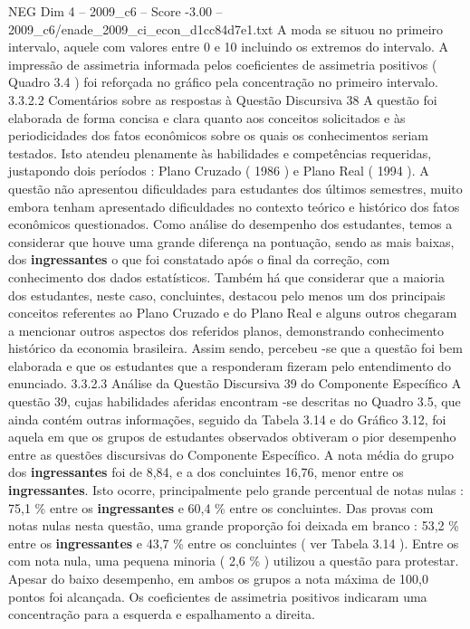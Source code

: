 \begin{textsample}{NEG Dim 4 – 2009\_c6 – Score -3.00 – 2009\_c6/enade\_2009\_ci\_econ\_d1cc84d7e1.txt}
A moda se situou no primeiro intervalo, aquele com valores entre 0 e 10 incluindo os extremos do intervalo.
A impressão de assimetria informada pelos coeficientes de assimetria positivos ( Quadro 3.4 ) foi reforçada no gráfico pela concentração no primeiro intervalo. 3.3.2.2 Comentários sobre as respostas à Questão Discursiva 38 A questão foi elaborada de forma concisa e clara quanto aos conceitos solicitados e às periodicidades dos fatos econômicos sobre os quais os conhecimentos seriam testados.
Isto atendeu plenamente às habilidades e competências requeridas, justapondo dois períodos : Plano Cruzado ( 1986 ) e Plano Real ( 1994 ).
A questão não apresentou dificuldades para estudantes dos últimos semestres, muito embora tenham apresentado dificuldades no contexto teórico e histórico dos fatos econômicos questionados.
Como análise do desempenho dos estudantes, temos a considerar que houve uma grande diferença na pontuação, sendo as mais baixas, dos \textbf{ingressantes} o que foi constatado após o final da correção, com conhecimento dos dados estatísticos.
Também há que considerar que a maioria dos estudantes, neste caso, concluintes, destacou pelo menos um dos principais conceitos referentes ao Plano Cruzado e do Plano Real e alguns outros chegaram a mencionar outros aspectos dos referidos planos, demonstrando conhecimento histórico da economia brasileira.
Assim sendo, percebeu -se que a questão foi bem elaborada e que os estudantes que a responderam fizeram pelo entendimento do enunciado. 3.3.2.3 Análise da Questão Discursiva 39 do Componente Específico A questão 39, cujas habilidades aferidas encontram -se descritas no Quadro 3.5, que ainda contém outras informações, seguido da Tabela 3.14 e do Gráfico 3.12, foi aquela em que os grupos de estudantes observados obtiveram o pior desempenho entre as questões discursivas do Componente Específico.
A nota média do grupo dos \textbf{ingressantes} foi de 8,84, e a dos concluintes 16,76, menor entre os \textbf{ingressantes}.
Isto ocorre, principalmente pelo grande percentual de notas nulas : 75,1 \% entre os \textbf{ingressantes} e 60,4 \% entre os concluintes.
Das provas com notas nulas nesta questão, uma grande proporção foi deixada em branco : 53,2 \% entre os \textbf{ingressantes} e 43,7 \% entre os concluintes ( ver Tabela 3.14 ).
Entre os com nota nula, uma pequena minoria ( 2,6 \% ) utilizou a questão para protestar.
Apesar do baixo desempenho, em ambos os grupos a nota máxima de 100,0 pontos foi alcançada.
Os coeficientes de assimetria positivos indicaram uma concentração para a esquerda e espalhamento a direita.

\end{textsample}
